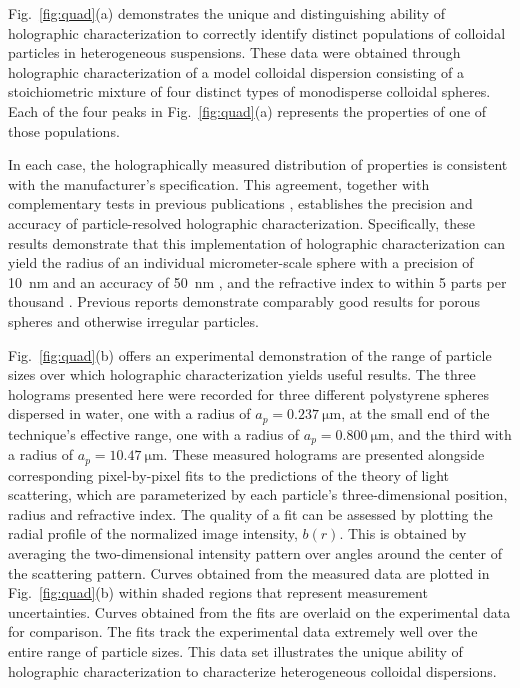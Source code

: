 Fig.~\ref{fig:quad}(a) demonstrates the unique and distinguishing ability of holographic characterization to correctly identify distinct populations of colloidal particles in heterogeneous suspensions. 
These data were obtained through holographic
characterization of a model colloidal dispersion
consisting of a stoichiometric mixture of
four distinct types of monodisperse colloidal spheres.
Each of the four peaks in Fig.~\ref{fig:quad}(a) represents the
properties of one of those populations.
  
In each case, the holographically
measured distribution of properties is consistent
with the manufacturer's specification.
This agreement, together with complementary
tests in previous publications 
\cite{lee07a,cheong11,shpaisman12,moyses13,krishnatreya14},
establishes the precision and accuracy of particle-resolved
holographic characterization.
Specifically, these results demonstrate that this implementation of holographic characterization can yield the radius of an individual micrometer-scale sphere with a precision of \SI{10}{\nm} and an accuracy of \SI{50}{\nm} \cite{krishnatreya14}, and the refractive index to within 5 parts per thousand \cite{shpaisman12}. Previous reports \cite{cheong11, hannel15} demonstrate comparably good results for porous spheres and otherwise irregular particles.

Fig.~\ref{fig:quad}(b) offers an experimental demonstration of the range of particle sizes over which holographic characterization yields useful results. The three holograms presented here were recorded for three different polystyrene spheres dispersed in water, one with a radius of $a_p = \SI{0.237}{\um}$, at the small end of the technique’s effective range, one with a radius of $a_p = \SI{0.800}{\um}$, and the third with a radius of $a_p = \SI{10.47}{\um}$. These measured holograms are presented alongside corresponding pixel-by-pixel fits to the predictions of the theory of light scattering, which are parameterized by each particle’s three-dimensional position, radius and refractive index. The quality of a fit can be assessed by plotting the radial profile of the normalized image intensity, $b(r)$. This is obtained by averaging the two-dimensional intensity pattern over angles around the center of the scattering pattern. Curves obtained from the measured data are plotted in Fig.~\ref{fig:quad}(b) within shaded regions that represent measurement uncertainties. Curves obtained from the fits are overlaid on the experimental data for comparison. The fits track the experimental data extremely well over the entire range of particle sizes.
This data set illustrates the unique ability of holographic
characterization to characterize heterogeneous colloidal dispersions.

